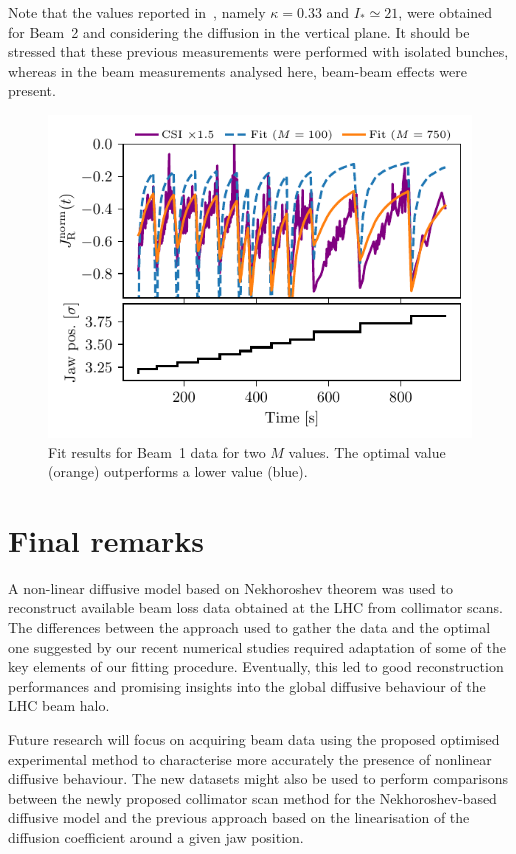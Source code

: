 Note that the values reported in~\cite{bazzani2020diffusion}, namely $\kappa=0.33 $ and $I_\ast \simeq 21$, were obtained for Beam~2 and considering the diffusion in the vertical plane. It should be stressed that these previous measurements were performed with isolated bunches, whereas in the beam measurements analysed here, beam-beam effects were present. 

\begin{figure}[htb]
    \centering
    \includegraphics[trim={0 2.5mm 0 3mm}, clip, width=0.95\columnwidth]{5_Diffusion_measurement_LHC/figs/fifth.pdf}
    \caption{Fit results for Beam~1 data for two $M$ values. The optimal value (orange) outperforms a lower value (blue).}
    \label{fig:fifth}
\end{figure}
%
\section{Final remarks}
%
A non-linear diffusive model based on Nekhoroshev theorem was used to reconstruct available beam loss data obtained at the  LHC from collimator scans. The differences between the approach used to gather the data and the optimal one suggested by our recent numerical studies required adaptation of some of the key elements of our fitting procedure. Eventually, this led to good reconstruction performances and promising insights into the global diffusive behaviour of the LHC beam halo.

Future research will focus on acquiring beam data using the proposed optimised experimental method to characterise more accurately the presence of nonlinear diffusive behaviour. The new datasets might also be used to perform comparisons between the newly proposed collimator scan method for the Nekhoroshev-based diffusive model and the previous approach based on the linearisation of the diffusion coefficient around a given jaw position.
